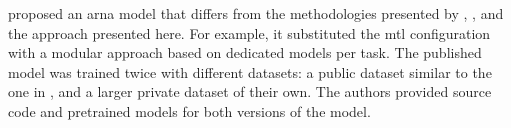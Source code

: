
\textcite{mcleod2021modular} proposed an \gls{arna} model
that differs from the methodologies presented by
\textcite{chen2021attend}, \textcite{micchi2021deep}, and
the approach presented here. For example, it substituted the
\gls{mtl} configuration with a modular approach based on
dedicated models per task. The published model was trained
twice with different datasets: a public dataset similar to
the one in \textcite{micchi2021deep}, and a larger private
dataset of their own. The authors provided source code and
pretrained models for both versions of the model. 
